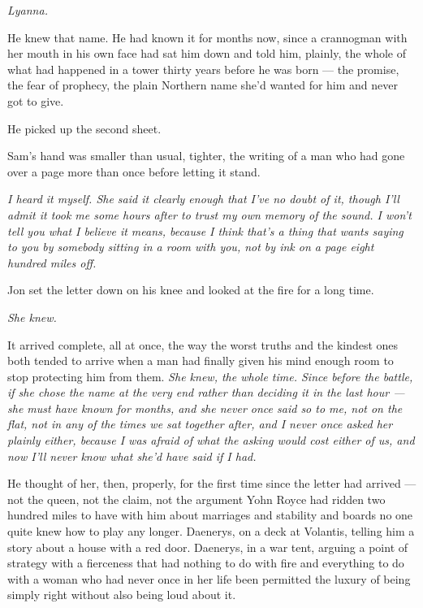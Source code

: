 \textit{Lyanna.}

He knew that name. He had known it for months now, since a crannogman with her mouth in his own face had sat him down and told him, plainly, the whole of what had happened in a tower thirty years before he was born — the promise, the fear of prophecy, the plain Northern name she’d wanted for him and never got to give.

He picked up the second sheet.

\sceneBreak

Sam’s hand was smaller than usual, tighter, the writing of a man who had gone over a page more than once before letting it stand.

\textit{I heard it myself. She said it clearly enough that I’ve no doubt of it, though I’ll admit it took me some hours after to trust my own memory of the sound. I won’t tell you what I believe it means, because I think that’s a thing that wants saying to you by somebody sitting in a room with you, not by ink on a page eight hundred miles off.}

Jon set the letter down on his knee and looked at the fire for a long time.

\textit{She knew.}

It arrived complete, all at once, the way the worst truths and the kindest ones both tended to arrive when a man had finally given his mind enough room to stop protecting him from them. \textit{She knew, the whole time. Since before the battle, if she chose the name at the very end rather than deciding it in the last hour — she must have known for months, and she never once said so to me, not on the flat, not in any of the times we sat together after, and I never once asked her plainly either, because I was afraid of what the asking would cost either of us, and now I’ll never know what she’d have said if I had.}

\sceneBreak

He thought of her, then, properly, for the first time since the letter had arrived — not the queen, not the claim, not the argument Yohn Royce had ridden two hundred miles to have with him about marriages and stability and boards no one quite knew how to play any longer. Daenerys, on a deck at Volantis, telling him a story about a house with a red door. Daenerys, in a war tent, arguing a point of strategy with a fierceness that had nothing to do with fire and everything to do with a woman who had never once in her life been permitted the luxury of being simply right without also being loud about it.

